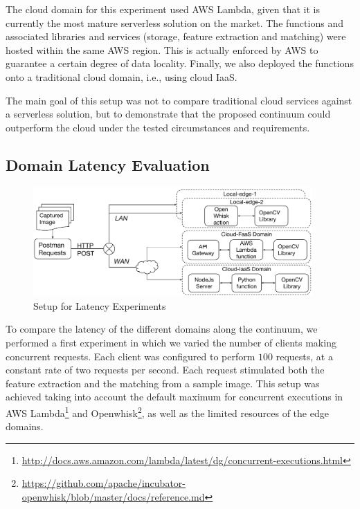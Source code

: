 
The cloud domain for this experiment used AWS Lambda, given that it is currently the most mature serverless solution on the market. The functions and associated libraries and services (storage, feature extraction and matching) were hosted within the same AWS region. This is actually enforced by AWS to guarantee a certain degree of data locality. Finally, we also deployed the functions onto a traditional cloud domain, i.e., using cloud IaaS. 

The main goal of  this setup was not to compare traditional cloud services against a serverless solution, but to demonstrate that the proposed continuum could outperform the cloud under the tested circumstances and requirements.


\subsection{Domain Latency Evaluation} 


\begin{figure}[htb]
	\centering
	\includegraphics[width=0.95\textwidth]{figs/experimental-setup.pdf}
	\caption{Setup for Latency Experiments}
	\label{fig:exp-setup1}
\end{figure}

To compare the latency of the different domains along the continuum, we performed a first experiment in which we varied the number of clients making concurrent requests. Each client was configured to perform $100$ requests, at a constant rate of two requests per second. Each request stimulated both the feature extraction and the matching from a sample image. This setup was achieved taking into account the default maximum for concurrent executions in AWS Lambda\footnote{\url{http://docs.aws.amazon.com/lambda/latest/dg/concurrent-executions.html}} and Openwhisk\footnote{\url{https://github.com/apache/incubator-openwhisk/blob/master/docs/reference.md}}, as well as the limited resources of the edge domains. 

